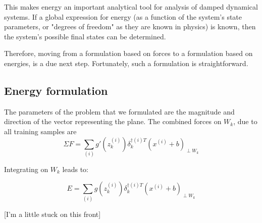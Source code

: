 \documentclass[]{article}
\begin{document}
 		This makes energy an important analytical tool for analysis of damped dynamical systems. If a global expression for energy (as a function of the system's state parameters, or "degrees of freedom" as they are known in physics) is known, then the system's possible final states can be determined.
 		
 		Therefore, moving from a formulation based on forces to a formulation based on energies, is a due next step. Fortunately, such a formulation is straightforward. 
 		
 	\subsection{Energy formulation}
 		The parameters of the problem that we formulated are the magnitude and direction of the vector representing the plane. The combined forces on $W_k$, due to all training samples are 
 		$$\Sigma F = \sum\limits_{(i)} g'(z^{(i)}_k)  \delta^{\dagger (i) T}_k (x^{(i)}+b)_{\perp W_k}$$

		Integrating on $W_k$ leads to:
		
		$$E = \sum\limits_{(i)} g(z^{(i)}_k)  \delta^{\dagger (i) T}_k (x^{(i)}+b)_{\perp W_k}$$
		
		[I'm a little stuck on this front]
 		
 		
 		
 		 
 
 
 
 

 
\end{document}
